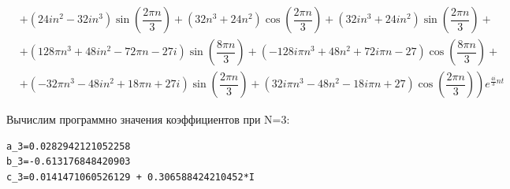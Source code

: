 \documentclass[a4paper, 16pt]{article}
\begin{document}
\begin{align*}
    & +\left(24in^2-32in^3\right)\sin\left(\dfrac{2{\pi}n}{3}\right)+\left(32n^3+24n^2\right)\cos\left(\dfrac{2{\pi}n}{3}\right)+\left(32in^3+24in^2\right)\sin\left(\dfrac{2{\pi}n}{3}\right)+\\
    & +\left(128{\pi}n^3+48in^2-72{\pi}n-27i\right)\sin\left(\dfrac{8{\pi}n}{3}\right)+\left(-128i{\pi}n^3+48n^2+72i{\pi}n-27\right)\cos\left(\dfrac{8{\pi}n}{3}\right)+\\
    & \left.+\left(-32{\pi}n^3-48in^2+18{\pi}n+27i\right)\sin\left(\dfrac{2{\pi}n}{3}\right)+\left(32i{\pi}n^3-48n^2-18i{\pi}n+27\right)\cos\left(\dfrac{2{\pi}n}{3}\right)\right)e^{\frac{4i}{3}nt}
\end{align*}


\newpage
\noindent Вычислим программно значения коэффициентов при N=3:
\begin{lstlisting}
a_3=0.0282942121052258
b_3=-0.613176848420903
c_3=0.0141471060526129 + 0.306588424210452*I
\end{lstlisting}
\end{document}
